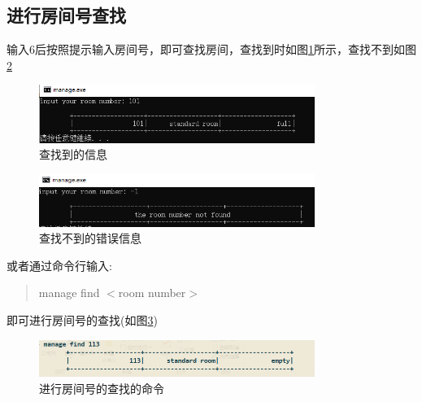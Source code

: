 \documentclass[UTF8]{ctexart}
\begin{document}
  \subsection{进行房间号查找}
    输入6后按照提示输入房间号，即可查找房间，查找到时如图\ref{fig:6_1}所示，查找不到如图\ref{fig:6_2}
    \begin{figure}[H]
      \centering
      \includegraphics[width=0.8\textwidth]{6_1}
      \caption{查找到的信息}
      \label{fig:6_1}
    \end{figure}
    \begin{figure}[H]
      \centering
      \includegraphics[width=0.8\textwidth]{6_2}
      \caption{查找不到的错误信息}
      \label{fig:6_2}
    \end{figure}
    或者通过命令行输入:
    \begin{quote}
      manage find $<$room number$>$
    \end{quote}
    即可进行房间号的查找(如图\ref{fig:c_6})
    \begin{figure}[H]
      \centering
      \includegraphics[width=0.8\textwidth]{c_6}
      \caption{进行房间号的查找的命令}
      \label{fig:c_6}
    \end{figure}
\end{document}
